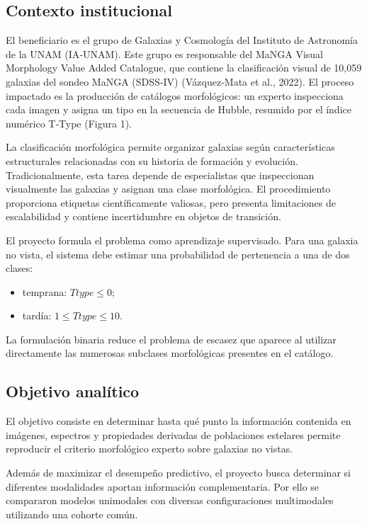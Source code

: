 \documentclass[letterpaper,11pt]{article}
\begin{document}
\subsection{Contexto institucional}

El beneficiario es el grupo de Galaxias y Cosmología del Instituto de Astronomía de la UNAM (IA‑UNAM). Este grupo es responsable del MaNGA Visual Morphology Value Added Catalogue, que contiene la clasificación visual de 10,059 galaxias del sondeo MaNGA (SDSS‑IV) \parencite{pedregosa2011} (Vázquez‑Mata et al., 2022). El proceso impactado es la producción de catálogos morfológicos: un experto inspecciona cada imagen y asigna un tipo en la secuencia de Hubble, resumido por el índice numérico T‑Type (Figura 1).

La clasificación morfológica permite organizar galaxias según características estructurales relacionadas con su historia de formación y evolución. Tradicionalmente, esta tarea depende de especialistas que inspeccionan visualmente las galaxias y asignan una clase morfológica. El procedimiento proporciona etiquetas científicamente valiosas, pero presenta limitaciones de escalabilidad y contiene incertidumbre en objetos de transición. 

El proyecto formula el problema como aprendizaje supervisado. Para una galaxia no vista, el sistema debe estimar una probabilidad de pertenencia a una de dos clases:

\begin{itemize} 
  \item temprana: $Ttype \leq 0$; 
  \item tardía: $1 \leq Ttype \leq 10$. 
\end{itemize}

La formulación binaria reduce el problema de escasez que aparece al utilizar directamente las numerosas subclases morfológicas presentes en el catálogo. 

\subsection{Objetivo analítico} 

El objetivo consiste en determinar hasta qué punto la información contenida en imágenes, espectros y propiedades derivadas de poblaciones estelares permite reproducir el criterio morfológico experto sobre galaxias no vistas. 

Además de maximizar el desempeño predictivo, el proyecto busca determinar si diferentes modalidades aportan información complementaria. Por ello se compararon modelos unimodales con diversas configuraciones multimodales utilizando una cohorte común.
\end{document}
